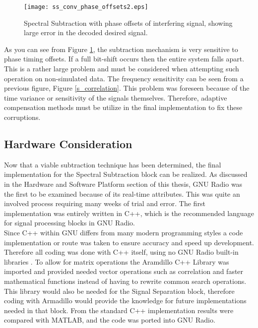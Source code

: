 \begin{figure}[!ht]\label{shifting}
\centering
\texttt{[image: ss\_conv\_phase\_offsets2.eps]}
\caption{Spectral Subtraction with phase offsets of interfering signal, showing large error in the decoded desired signal.}
\end{figure}

As you can see from Figure \ref{shifting}, the subtraction mechanism is very sensitive to phase timing offsets.  If a full bit-shift occurs then the entire system falls apart.  This is a rather large problem and must be considered when attempting such operation on non-simulated data.  The frequency sensitivity can be seen from a previous figure, Figure \ref{s_correlation}.  This problem was foreseen because of the time variance or sensitivity of the signals themselves.  Therefore, adaptive compensation methods must be utilize in the final implementation to fix these corruptions.\\

\subsection{Hardware Consideration}

Now that a viable subtraction technique has been determined, the final implementation for the Spectral Subtraction block can be realized.  As discussed in the Hardware and Software Platform section of this thesis, GNU Radio was the first to be examined because of its real-time attributes.  This was quite an involved process requiring many weeks of trial and error.  The first implementation was entirely written in C++, which is the recommended language for signal processing blocks in GNU Radio.\\  

Since C++ within GNU differs from many modern programming styles a code implementation or route was taken to ensure accuracy and speed up development.  Therefore all coding was done with C++ itself, using no GNU Radio built-in libraries \cite{gnuradioCPP}.  To allow for matrix operations the Aramdillo C++ Library \cite{armadillo} was imported and provided needed vector operations such as correlation and faster mathematical functions instead of having to rewrite common search operations.  This library would also be needed for the Signal Separation block, therefore coding with Armadillo would provide the knowledge for future implementations needed in that block.  From the standard C++ implementation results were compared with MATLAB, and the code was ported into GNU Radio.\\


